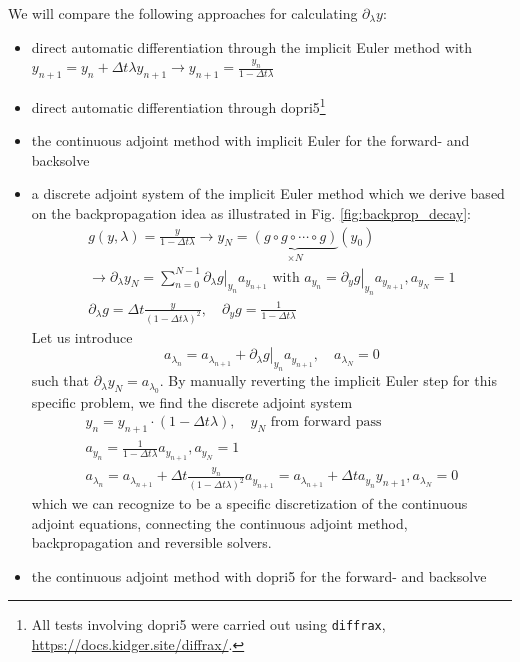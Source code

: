 We will compare the following approaches for calculating $\partial_\lambda y$:

\begin{itemize}
    \item direct automatic differentiation through the implicit Euler method with
    $y_{n+1} = y_n + \Delta t \lambda y_{n+1} \rightarrow y_{n+1} = \frac{y_n}{1-\Delta t \lambda}$
    \item direct automatic differentiation through dopri5\footnote{All tests involving dopri5 were carried out using \texttt{diffrax}, \url{https://docs.kidger.site/diffrax/}.}
    \item the continuous adjoint method with implicit Euler for the forward- and backsolve
    \item a discrete adjoint system of the implicit Euler method which we derive based on 
    the backpropagation idea as illustrated in Fig. \ref{fig:backprop_decay}:
    \begin{equation}
        \begin{gathered}
            g(y,\lambda) = \frac{y}{1-\Delta t \lambda} \rightarrow y_{N} = \underbrace{\left(g \circ g \circ \cdots \circ g\right)}_{\times N}(y_0) \\
            \rightarrow \partial_\lambda y_N = \sum_{n=0}^{N-1} \left.\partial_\lambda g \right|_{y_n} a_{y_{n+1}} \text{ with } a_{y_{n}} = \left.\partial_y g \right|_{y_n} a_{y_{n+1}}, a_{y_N} = 1 \\
            \partial_\lambda g = \Delta t \frac{y}{(1 - \Delta t \lambda)^2}, \quad \partial_y g = \frac{1}{1 - \Delta t \lambda}
        \end{gathered}
    \end{equation}
    Let us introduce
    \begin{equation}
        a_{\lambda_n} = a_{\lambda_{n+1}} + \left.\partial_\lambda g \right|_{y_n} a_{y_{n+1}}, \quad a_{\lambda_N} = 0
    \end{equation}
    such that $\partial_\lambda y_N = a_{\lambda_0}$. By manually reverting the implicit Euler step for this specific problem, we find the discrete
    adjoint system
    \begin{equation}
        \begin{gathered}
            y_n = y_{n+1} \cdot (1 - \Delta t \lambda), \quad y_N \text{ from forward pass} \\
            a_{y_{n}} = \frac{1}{1 - \Delta t \lambda} a_{y_{n+1}}, a_{y_N} = 1 \\
            a_{\lambda_n} = a_{\lambda_{n+1}} + \Delta t \frac{y_n}{(1 - \Delta t \lambda)^2} a_{y_{n+1}} = a_{\lambda_{n+1}} + \Delta t a_{y_{n}} y_{n+1}, a_{\lambda_N} = 0
        \end{gathered}
        \label{eq:backprop_decay}
    \end{equation}
    which we can recognize to be a specific discretization of the continuous adjoint equations, connecting
    the continuous adjoint method, backpropagation and reversible solvers.
    \item the continuous adjoint method with dopri5 for the forward- and backsolve
\end{itemize}

